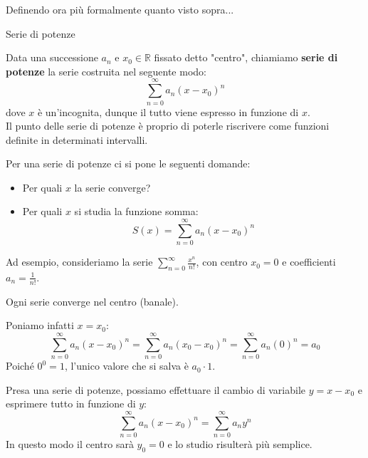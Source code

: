 \documentclass[12pt]{report}
\newcommand{\R}{\mathbb{R}}
\begin{document}
	Definendo ora più formalmente quanto visto sopra...
	
	\begin{definizione}{Serie di potenze}{}
		
		Data una successione $a_n$ e $x_0 \in \R$ fissato detto "centro", chiamiamo \textbf{serie di potenze} la serie costruita nel seguente modo:
		\[
		\sum_{n=0}^{\infty} a_n (x - x_0)^n
		\]
		dove $x$ è un'incognita, dunque il tutto viene espresso in funzione di $x$.\\
		Il punto delle serie di potenze è proprio di poterle riscrivere come funzioni definite in determinati intervalli.
		
	\end{definizione}
	
	Per una serie di potenze ci si pone le seguenti domande:
	\begin{itemize}
		
		\item Per quali $x$ la serie converge?
		
		\item Per quali $x$ si studia la funzione somma:
		\[
		S(x) = \sum_{n=0}^{\infty} a_n (x - x_0)^n
		\]
		
	\end{itemize}
	
	Ad esempio, consideriamo la serie $\sum_{n=0}^{\infty} \frac{x^n}{n!}$, con centro $x_0 = 0$ e coefficienti $a_n = \frac{1}{n!}$.
	
	\begin{osservazione}{}{}
		
		Ogni serie converge nel centro (banale).
		
		Poniamo infatti $x = x_0$:
		\[
		\sum_{n=0}^{\infty} a_n (x - x_0)^n = \sum_{n=0}^{\infty} a_n (x_0 - x_0)^n = \sum_{n=0}^{\infty} a_n (0)^n = a_0
		\]
		Poiché $0^0 = 1$, l'unico valore che si salva è $a_0 \cdot 1$.
		
	\end{osservazione}
	
	\begin{osservazione}{}{}
		
		Presa una serie di potenze, possiamo effettuare il cambio di variabile $y = x - x_0$ e esprimere tutto in funzione di $y$:
		\[
		\sum_{n=0}^{\infty} a_n (x - x_0)^n = \sum_{n=0}^{\infty} a_n y^n
		\]
		In questo modo il centro sarà $y_0 = 0$ e lo studio risulterà più semplice.
		
	\end{osservazione}
	
\end{document}
